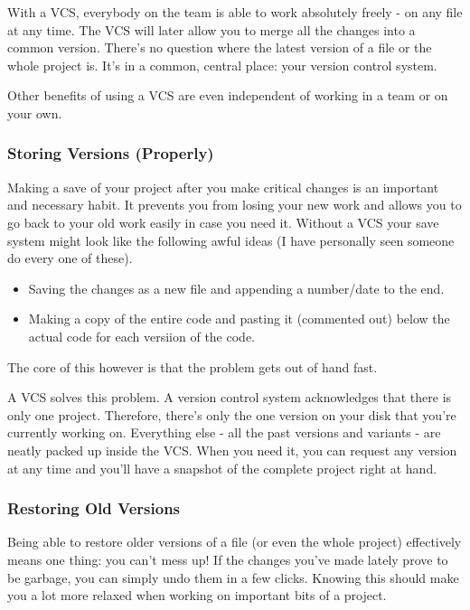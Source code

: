 \documentclass{article}
\begin{document}
    With a VCS, everybody on the team is able to work absolutely freely - on any file at any time. The VCS will later allow you to merge all the changes into a common version. There's no question where the latest version of a file or the whole project is. It's in a common, central place: your version control system.

    Other benefits of using a VCS are even independent of working in a team or on your own.
    
    \subsubsection{Storing Versions (Properly)}
    Making a save of your project after you make critical changes is an important and necessary habit. It prevents you from losing your new work and allows you to go back to your old work easily in case you need it. Without a VCS your save system might look like the following awful ideas (I have personally seen someone do every one of these).
    \begin{itemize}
        \item Saving the changes as a new file and appending a number/date to the end.
        \item Making a copy of the entire code and pasting it (commented out) below the actual code for each versiion of the code.
    \end{itemize}
    The core of this however is that the problem gets out of hand fast. 
    
    A VCS solves this problem. A version control system acknowledges that there is only one project. Therefore, there's only the one version on your disk that you're currently working on. Everything else - all the past versions and variants - are neatly packed up inside the VCS. When you need it, you can request any version at any time and you'll have a snapshot of the complete project right at hand.
    \subsubsection{Restoring Old Versions}
    Being able to restore older versions of a file (or even the whole project) effectively means one thing: you can't mess up! If the changes you've made lately prove to be garbage, you can simply undo them in a few clicks. Knowing this should make you a lot more relaxed when working on important bits of a project.
    
\end{document}
